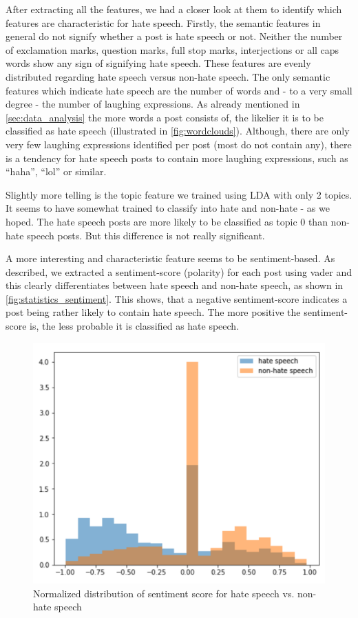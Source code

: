 After extracting all the features, we had a closer look at them to identify which features are characteristic for hate speech.
Firstly, the semantic features in general do not signify whether a post is hate speech or not. Neither the number of exclamation marks, question marks, full stop marks, interjections or all caps words show any sign of signifying hate speech. These features are evenly distributed regarding hate speech versus non-hate speech.
The only semantic features which indicate hate speech are the number of words and - to a very small degree - the number of laughing expressions.
As already mentioned in \autoref{sec:data_analysis} the more words a post consists of, the likelier it is to be classified as hate speech (illustrated in \autoref{fig:wordclouds}).
Although, there are only very few laughing expressions identified per post (most do not contain any), there is a tendency for hate speech posts to contain more laughing expressions, such as \enquote{haha}, \enquote{lol} or similar.

Slightly more telling is the topic feature we trained using LDA with only 2 topics. It seems to have somewhat trained to classify into hate and non-hate - as we hoped. The hate speech posts are more likely to be classified as topic 0 than non-hate speech posts. But this difference is not really significant.

A more interesting and characteristic feature seems to be sentiment-based. As described, we extracted a sentiment-score (polarity) for each post using vader and this clearly differentiates between hate speech and non-hate speech, as shown in \autoref{fig:statistics_sentiment}.
This shows, that a negative sentiment-score indicates a post being rather likely to contain hate speech. The more positive the sentiment-score is, the less probable it is classified as hate speech.

\begin{figure}[ht]
	\centering
	\includegraphics[width=0.7\linewidth]{figures/statistics_sentiment.png}
	\caption{Normalized distribution of sentiment score for hate speech vs. non-hate speech}
	\label{fig:statistics_sentiment}
\end{figure}

